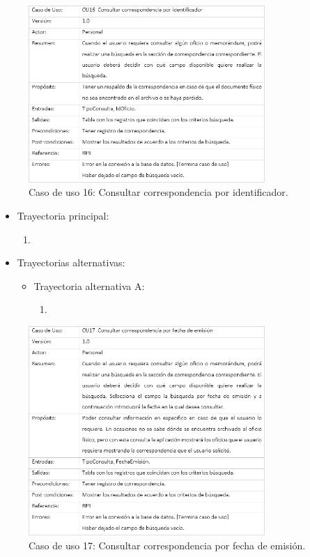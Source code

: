 
\begin{figure}[htbp!]
		\centering
			\includegraphics[width=0.8\textwidth]{images/CU/CU16}
		\caption{Caso de uso 16: Consultar correspondencia por identificador.}
		\label{Tabla}
	\end{figure}
	
\begin{itemize}
	\item Trayectoria principal:
	\begin{enumerate}
		\item 
	\end{enumerate}
	
	\item Trayectorias alternativas:
	\begin{itemize}
		\item Trayectoria alternativa A:
			\begin{enumerate}
				\item 
			\end{enumerate}
	\end{itemize}
\end{itemize}


\begin{figure}[htbp!]
		\centering
			\includegraphics[width=0.8\textwidth]{images/CU/CU17}
		\caption{Caso de uso 17: Consultar correspondencia por fecha de emisión.}
		\label{Tabla}
	\end{figure}
	
